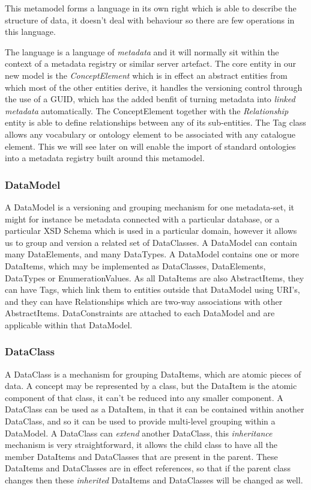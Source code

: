\documentclass{llncs}
\begin{document}
This metamodel forms a language in its own right which is able to describe the structure of data, it doesn't deal with behaviour so there are few operations in this language.

The language is a language of \emph{metadata} and it will normally sit within the context of a metadata registry or similar server artefact. The core entity in our new model is the \emph{ConceptElement} which is in effect an abstract entities from which most of the other entities derive, it handles the versioning control through the use of a GUID, which has the added benfit of turning metadata into \emph{linked metadata} automatically. The ConceptElement together with the \emph{Relationship} entity is able to define relationships between any of its sub-entities. The Tag class allows any vocabulary or ontology element to be associated with any catalogue element. This we will see later on will enable the import of standard ontologies into a metadata registry built around this metamodel.

\subsubsection{DataModel}
A DataModel is a versioning and grouping mechanism for one metadata-set, it might for instance be metadata connected with a particular database, or a particular XSD Schema which is used in a particular domain, however it allows us to group and version a related set of DataClasses.  A DataModel can contain many DataElements, and many DataTypes. A DataModel contains one or more DataItems, which may be implemented as DataClasses, DataElements, DataTypes or EnumerationValues. As all DataItems are also AbstractItems, they can have Tags, which link them to entities outside that DataModel using URI's, and they can have Relationships which are two-way associations with other AbstractItems. DataConstraints are attached to each DataModel and are applicable within that DataModel.

\subsubsection{DataClass}
 A DataClass is a mechanism for grouping DataItems, which are atomic pieces of data. A concept may be represented by a class, but the DataItem is the atomic component of that class, it can't be reduced into any smaller component. A DataClass can be used as a DataItem, in that it can be contained within another DataClass, and so it can be used to provide multi-level grouping within a DataModel. A DataClass can \emph{extend} another DataClass, this \emph{inheritance} mechanism is very straightforward, it allows the child class to have all the member DataItems and DataClasses that are present in the parent. These DataItems and DataClasses are in effect references, so that if the parent class changes then these \emph{inherited} DataItems and DataClasses will be changed as well.
 
\end{document}

